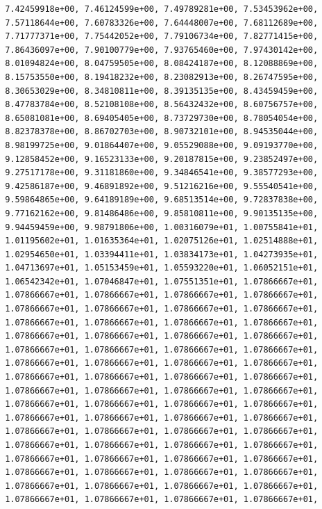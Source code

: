 \documentclass[
  letterpaper,
]{scrreprt}
\begin{document}
\begin{verbatim}
       7.42459918e+00, 7.46124599e+00, 7.49789281e+00, 7.53453962e+00,
       7.57118644e+00, 7.60783326e+00, 7.64448007e+00, 7.68112689e+00,
       7.71777371e+00, 7.75442052e+00, 7.79106734e+00, 7.82771415e+00,
       7.86436097e+00, 7.90100779e+00, 7.93765460e+00, 7.97430142e+00,
       8.01094824e+00, 8.04759505e+00, 8.08424187e+00, 8.12088869e+00,
       8.15753550e+00, 8.19418232e+00, 8.23082913e+00, 8.26747595e+00,
       8.30653029e+00, 8.34810811e+00, 8.39135135e+00, 8.43459459e+00,
       8.47783784e+00, 8.52108108e+00, 8.56432432e+00, 8.60756757e+00,
       8.65081081e+00, 8.69405405e+00, 8.73729730e+00, 8.78054054e+00,
       8.82378378e+00, 8.86702703e+00, 8.90732101e+00, 8.94535044e+00,
       8.98199725e+00, 9.01864407e+00, 9.05529088e+00, 9.09193770e+00,
       9.12858452e+00, 9.16523133e+00, 9.20187815e+00, 9.23852497e+00,
       9.27517178e+00, 9.31181860e+00, 9.34846541e+00, 9.38577293e+00,
       9.42586187e+00, 9.46891892e+00, 9.51216216e+00, 9.55540541e+00,
       9.59864865e+00, 9.64189189e+00, 9.68513514e+00, 9.72837838e+00,
       9.77162162e+00, 9.81486486e+00, 9.85810811e+00, 9.90135135e+00,
       9.94459459e+00, 9.98791806e+00, 1.00316079e+01, 1.00755841e+01,
       1.01195602e+01, 1.01635364e+01, 1.02075126e+01, 1.02514888e+01,
       1.02954650e+01, 1.03394411e+01, 1.03834173e+01, 1.04273935e+01,
       1.04713697e+01, 1.05153459e+01, 1.05593220e+01, 1.06052151e+01,
       1.06542342e+01, 1.07046847e+01, 1.07551351e+01, 1.07866667e+01,
       1.07866667e+01, 1.07866667e+01, 1.07866667e+01, 1.07866667e+01,
       1.07866667e+01, 1.07866667e+01, 1.07866667e+01, 1.07866667e+01,
       1.07866667e+01, 1.07866667e+01, 1.07866667e+01, 1.07866667e+01,
       1.07866667e+01, 1.07866667e+01, 1.07866667e+01, 1.07866667e+01,
       1.07866667e+01, 1.07866667e+01, 1.07866667e+01, 1.07866667e+01,
       1.07866667e+01, 1.07866667e+01, 1.07866667e+01, 1.07866667e+01,
       1.07866667e+01, 1.07866667e+01, 1.07866667e+01, 1.07866667e+01,
       1.07866667e+01, 1.07866667e+01, 1.07866667e+01, 1.07866667e+01,
       1.07866667e+01, 1.07866667e+01, 1.07866667e+01, 1.07866667e+01,
       1.07866667e+01, 1.07866667e+01, 1.07866667e+01, 1.07866667e+01,
       1.07866667e+01, 1.07866667e+01, 1.07866667e+01, 1.07866667e+01,
       1.07866667e+01, 1.07866667e+01, 1.07866667e+01, 1.07866667e+01,
       1.07866667e+01, 1.07866667e+01, 1.07866667e+01, 1.07866667e+01,
       1.07866667e+01, 1.07866667e+01, 1.07866667e+01, 1.07866667e+01,
       1.07866667e+01, 1.07866667e+01, 1.07866667e+01, 1.07866667e+01,
       1.07866667e+01, 1.07866667e+01, 1.07866667e+01, 1.07866667e+01,

\end{verbatim}
\end{document}

